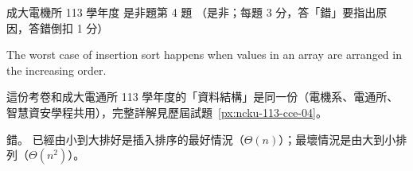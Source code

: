 \begin{pastexam}[label={px:ncku-113-ee-04}]{成大電機所 113 學年度 是非題第 4 題}
（是非；每題 3 分，答「錯」要指出原因，答錯倒扣 1 分）

The worst case of insertion sort happens when values in an array are arranged in the
increasing order.
\end{pastexam}

\begin{pastsoln}
這份考卷和成大電通所 113 學年度的「資料結構」是同一份（電機系、電通所、智慧資安學程共用），完整詳解見歷屆試題~\ref{px:ncku-113-cce-04}。

錯。 已經由小到大排好是插入排序的最好情況（$\Theta(n)$）；最壞情況是由大到小排列（$\Theta(n^2)$）。
\end{pastsoln}
